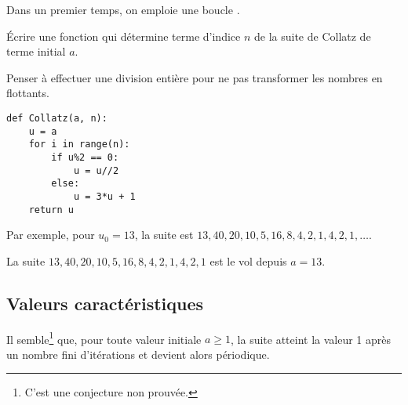 Dans un premier temps, on emploie une boucle .
\begin{Exercise}[title= Valeur]\it

Écrire une fonction  qui détermine terme d'indice $n$ de la suite de Collatz de terme initial $a$.
\end{Exercise}
\begin{Answer} Penser à effectuer une division entière pour ne pas transformer les nombres en flottants.
\begin{lstlisting}
def Collatz(a, n):
    u = a
    for i in range(n):
        if u%2 == 0:
            u = u//2
        else:
            u = 3*u + 1
    return u
\end{lstlisting}
\end{Answer}

Par exemple, pour $u_0=13$, la suite est 
$13, 40,20,10,5,16,8,4,2,1,4,2,1,\ldots$. 

La suite $13, 40,20,10,5,16,8,4,2,1,4,2,1$ est le vol depuis $a=13$.
\subsection{Valeurs caractéristiques} 
Il semble\footnote{C'est une conjecture non prouvée.} que, pour toute valeur initiale $a\ge 1$, la suite atteint la valeur 1 après un nombre fini d'itérations et devient alors périodique.

